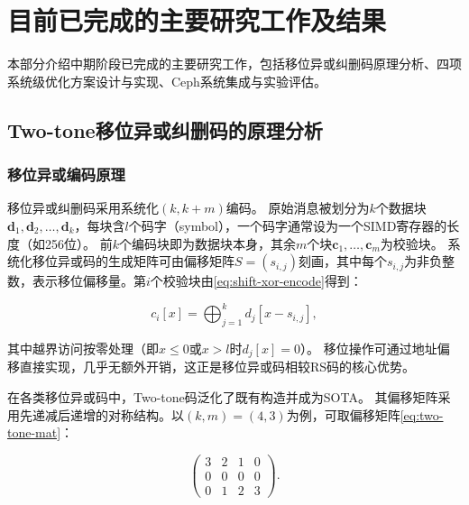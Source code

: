 \section{目前已完成的主要研究工作及结果}

本部分介绍中期阶段已完成的主要研究工作，包括移位异或纠删码原理分析、四项系统级优化方案设计与实现、Ceph系统集成与实验评估。

\subsection{Two-tone移位异或纠删码的原理分析}

\subsubsection{移位异或编码原理}

移位异或纠删码采用系统化$(k,k+m)$编码。
原始消息被划分为$k$个数据块$\boldsymbol{d}_1,\boldsymbol{d}_2,\ldots,\boldsymbol{d}_{k}$，每块含$l$个码字（symbol），一个码字通常设为一个SIMD寄存器的长度（如256位）。
前$k$个编码块即为数据块本身，其余$m$个块$\boldsymbol{c}_1,\ldots,\boldsymbol{c}_{m}$为校验块。
系统化移位异或码的生成矩阵可由偏移矩阵$S=(s_{i,j})$刻画，其中每个$s_{i,j}$为非负整数，表示移位偏移量。第$i$个校验块由\eqref{eq:shift-xor-encode}得到：

\begin{equation}
\label{eq:shift-xor-encode}
c_{i}[x] = \bigoplus_{j=1}^{k} d_j[x-s_{i,j}],
\end{equation}

其中越界访问按零处理（即$x\le0$或$x>l$时$d_j[x]=0$）。
移位操作可通过地址偏移直接实现，几乎无额外开销，这正是移位异或码相较RS码的核心优势。

在各类移位异或码中，Two-tone码\cite{fuTwotoneShiftXORStorage2021}泛化了既有构造并成为SOTA。
其偏移矩阵采用先递减后递增的对称结构。以$(k,m)=(4,3)$为例，可取偏移矩阵\eqref{eq:two-tone-mat}：

\begin{equation}
\label{eq:two-tone-mat}
    \begin{pmatrix}
        3 & 2 & 1 & 0\\
        0 & 0 & 0 & 0\\
        0 & 1 & 2 & 3
    \end{pmatrix}.
\end{equation}

